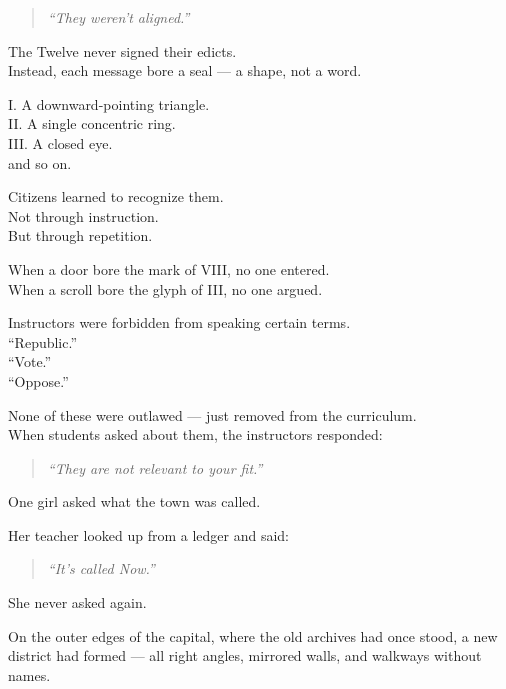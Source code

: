 \documentclass[12pt]{article}
\begin{document}
\begin{quote}
\textit{“They weren’t aligned.”}
\end{quote}

\vspace{1em}

The Twelve never signed their edicts.\\
Instead, each message bore a seal — a shape, not a word.

I. A downward-pointing triangle.\\
II. A single concentric ring.\\
III. A closed eye.\\
\textellipsis{} and so on.

Citizens learned to recognize them.\\
Not through instruction.\\
But through repetition.

When a door bore the mark of VIII, no one entered.\\
When a scroll bore the glyph of III, no one argued.

\vspace{1em}

Instructors were forbidden from speaking certain terms.\\
“Republic.”\\
“Vote.”\\
“Oppose.”

None of these were outlawed — just removed from the curriculum.\\
When students asked about them, the instructors responded:

\begin{quote}
\textit{“They are not relevant to your fit.”}
\end{quote}

\vspace{1em}

One girl asked what the town was called.

Her teacher looked up from a ledger and said:

\begin{quote}
\textit{“It’s called Now.”}
\end{quote}

She never asked again.

\vspace{1em}

On the outer edges of the capital, where the old archives had once stood, a new district had formed — all right angles, mirrored walls, and walkways without names.
\end{document}
